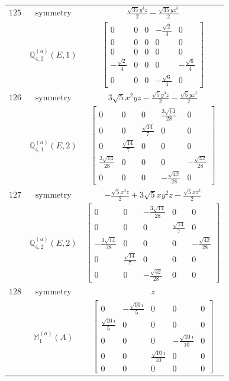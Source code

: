 \documentclass[fleqn,8pt,landscape]{jsarticle}
\begin{document}
\begin{longtable}{ccc}
$ 125 $ & $ \text{symmetry} $ & $ \frac{\sqrt{35} y^{3} z}{2} - \frac{\sqrt{35} y z^{3}}{2} $ \\
$  $ & $ \mathbb{Q}_{4,2}^{(a)}(E,1) $ & $ \begin{bmatrix} 0 & 0 & 0 & - \frac{\sqrt{2}}{4} & 0 \\ 0 & 0 & 0 & 0 & 0 \\ 0 & 0 & 0 & 0 & 0 \\ - \frac{\sqrt{2}}{4} & 0 & 0 & 0 & - \frac{\sqrt{6}}{4} \\ 0 & 0 & 0 & - \frac{\sqrt{6}}{4} & 0 \end{bmatrix} $ \\ \hline
$ 126 $ & $ \text{symmetry} $ & $ 3 \sqrt{5} x^{2} y z - \frac{\sqrt{5} y^{3} z}{2} - \frac{\sqrt{5} y z^{3}}{2} $ \\
$  $ & $ \mathbb{Q}_{4,1}^{(a)}(E,2) $ & $ \begin{bmatrix} 0 & 0 & 0 & \frac{3 \sqrt{14}}{28} & 0 \\ 0 & 0 & \frac{\sqrt{14}}{7} & 0 & 0 \\ 0 & \frac{\sqrt{14}}{7} & 0 & 0 & 0 \\ \frac{3 \sqrt{14}}{28} & 0 & 0 & 0 & - \frac{\sqrt{42}}{28} \\ 0 & 0 & 0 & - \frac{\sqrt{42}}{28} & 0 \end{bmatrix} $ \\ \hline
$ 127 $ & $ \text{symmetry} $ & $ - \frac{\sqrt{5} x^{3} z}{2} + 3 \sqrt{5} x y^{2} z - \frac{\sqrt{5} x z^{3}}{2} $ \\
$  $ & $ \mathbb{Q}_{4,2}^{(a)}(E,2) $ & $ \begin{bmatrix} 0 & 0 & - \frac{3 \sqrt{14}}{28} & 0 & 0 \\ 0 & 0 & 0 & \frac{\sqrt{14}}{7} & 0 \\ - \frac{3 \sqrt{14}}{28} & 0 & 0 & 0 & - \frac{\sqrt{42}}{28} \\ 0 & \frac{\sqrt{14}}{7} & 0 & 0 & 0 \\ 0 & 0 & - \frac{\sqrt{42}}{28} & 0 & 0 \end{bmatrix} $ \\ \hline
$ 128 $ & $ \text{symmetry} $ & $ z $ \\
$  $ & $ \mathbb{M}_{1}^{(a)}(A) $ & $ \begin{bmatrix} 0 & - \frac{\sqrt{10} i}{5} & 0 & 0 & 0 \\ \frac{\sqrt{10} i}{5} & 0 & 0 & 0 & 0 \\ 0 & 0 & 0 & - \frac{\sqrt{10} i}{10} & 0 \\ 0 & 0 & \frac{\sqrt{10} i}{10} & 0 & 0 \\ 0 & 0 & 0 & 0 & 0 \end{bmatrix} $ \\ \hline

\end{longtable}
\end{document}
